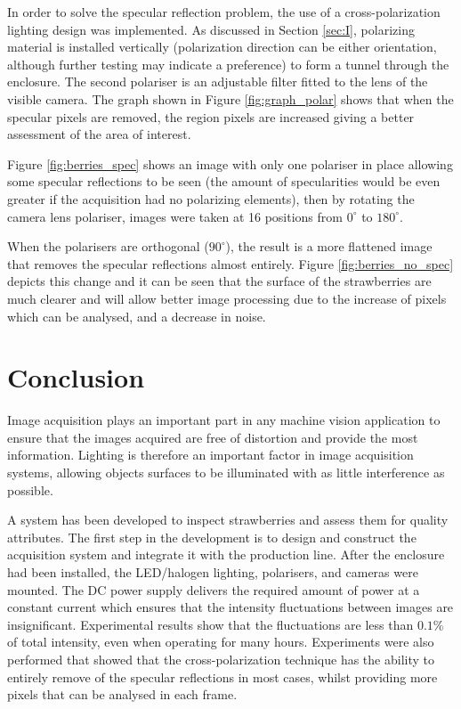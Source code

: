 \documentclass[fleqn,twoside,12pt]{report}
\begin{document}
In order to solve the specular reflection problem, the use of a cross-polarization lighting design was implemented. As discussed in Section \ref{sec:I}, polarizing material is installed vertically (polarization direction can be either orientation, although further testing may indicate a preference) to form a tunnel through the enclosure. The second polariser is an adjustable filter fitted to the lens of the visible camera. The graph shown in Figure \ref{fig:graph_polar} shows that when the specular pixels are removed, the region pixels are increased giving a better assessment of the area of interest.



Figure \ref{fig:berries_spec} shows an image with only one polariser in place allowing some specular reflections to be seen (the amount of specularities would be even greater if the acquisition had no polarizing elements), then by rotating the camera lens polariser, images were taken at 16 positions from $0^{\circ}$ to $180^{\circ}$.  


When the polarisers are orthogonal ($90^{\circ}$), the result is a more flattened image that removes the specular reflections almost entirely.  Figure \ref{fig:berries_no_spec} depicts this change and it can be seen that the surface of the strawberries are much clearer and will allow better image processing due to the increase of pixels which can be analysed, and a decrease in noise. 



\section{Conclusion}

Image acquisition plays an important part in any machine vision application to ensure that the images acquired are free of distortion and provide the most information. Lighting is therefore an important factor in image acquisition systems, allowing objects surfaces to be illuminated with as little interference as possible.

A system has been developed to inspect strawberries and assess them for quality attributes. The first step in the development is to design and construct the acquisition system and integrate it with the production line. After the enclosure had been installed, the LED/halogen lighting, polarisers, and cameras were mounted. The DC power supply delivers the required amount of power at a constant current which ensures that the intensity fluctuations between images are insignificant. Experimental results show that the fluctuations are less than $0.1\%$ of total intensity, even when operating for many hours. Experiments were also performed that showed that the cross-polarization technique has the ability to entirely remove of the specular reflections in most cases, whilst providing more pixels that can be analysed in each frame.  
\end{document}

